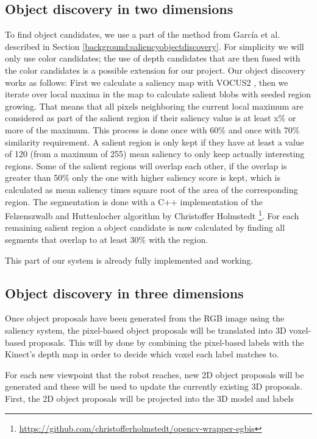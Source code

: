 \documentclass[a4paper,11pt,english]{article}
\begin{document}
\subsection{Object discovery in two dimensions}
\label{system:obj_discovery}
To find object candidates, we use a part of the method from García et al. described in Section \ref{background:saliencyobjectdiscovery}.
For simplicity we will only use color candidates; the use of depth candidates that are then fused with the color candidates is a possible extension for our project.
Our object discovery works as follows: First we calculate a saliency map with VOCUS2 \cite{frintrop2015traditional}, then we iterate over local maxima in the map to calculate salient blobs with seeded region growing.
That means that all pixels neighboring the current local maximum are considered as part of the salient region if their saliency value is at least x\% or more of the maximum.
This process is done once with 60\% and once with 70\% similarity requirement.
A salient region is only kept if they have at least a value of 120 (from a maximum of 255) mean saliency to only keep actually interesting regions.
Some of the salient regions will overlap each other, if the overlap is greater than 50\% only the one with higher saliency score is kept, which is calculated as mean saliency times square root of the area of the corresponding region.
The segmentation is done with a C++ implementation of the Felzenszwalb and Huttenlocher algorithm \cite{felzenszwalb2004efficient} by Christoffer Holmstedt \footnote{\url{https://github.com/christofferholmstedt/opencv-wrapper-egbis}}.
For each remaining salient region a object candidate is now calculated by finding all segments that overlap to at least 30\% with the region.

This part of our system is already fully implemented and working.

\subsection{Object discovery in three dimensions}
\label{system:fusion}
Once object proposals have been generated from the RGB image using the saliency system, the pixel-based object proposals will be translated into 3D voxel-based proposals.
This will by done by combining the pixel-based labels with the Kinect's depth map in order to decide which voxel each label matches to.

For each new viewpoint that the robot reaches, new 2D object proposals will be generated and these will be used to update the currently existing 3D proposals.
First, the 2D object proposals will be projected into the 3D model and labels
\end{document}
